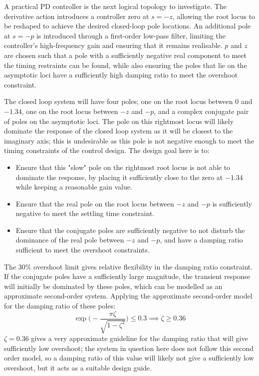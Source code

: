 \documentclass[11pt,a4paper]{article}
\begin{document}
A practical PD controller is the next logical topology to investigate. The derivative action introduces a controller zero at $s=-z$, allowing the root locus to be reshaped to achieve the desired closed-loop pole locations. An additional pole at $s=-p$ is introduced through a first-order low-pass filter, limiting the controller's high-frequency gain and ensuring that it remains realisable. $p$ and $z$ are chosen such that a pole with a sufficiently negative real component to meet the timing restraints can be found, while also ensuring the poles that lie on the asymptotic loci have a sufficiently high damping ratio to meet the overshoot constraint.

The closed loop system will have four poles; one on the root locus between $0$ and $-1.34$, one on the root locus between $-z$ and $-p$, and a complex conjugate pair of poles on the asymptotic loci. The pole on this rightmost locus will likely dominate the response of the closed loop system as it will be closest to the imaginary axis; this is undesirable as this pole is not negative enough to meet the timing constraints of the control design. The design goal here is to:
\begin{itemize}
    \item Ensure that this "slow" pole on the rightmost root locus is not able to dominate the response, by placing it sufficiently close to the zero at $-1.34$ while keeping a reasonable gain value.
    \item Ensure that the real pole on the root locus between $-z$ and $-p$ is sufficiently negative to meet the settling time constraint.
    \item Ensure that the conjugate poles are sufficiently negative to not disturb the dominance of the real pole between $-z$ and $-p$, and have a damping ratio sufficient to meet the overshoot constraints. 
\end{itemize}
The 30\% overshoot limit gives relative flexibility in the damping ratio constraint. If the conjugate poles have a sufficiently large magnitude, the transient response will initially be dominated by these poles, which can be modelled as an approximate second-order system. Applying the approximate second-order model for the damping ratio of these poles:
$$
\exp \big(-\frac{\pi \zeta}{\sqrt{1 - \zeta^2}} \big ) \le 0.3 \implies \zeta \ge 0.36 
$$
$\zeta=0.36$ gives a very approximate guideline for the damping ratio that will give sufficiently low overshoot; the system in question here does not follow this second order model, so a damping ratio of this value will likely not give a sufficiently low overshoot, but it acts as a suitable design guide. 
\end{document}
